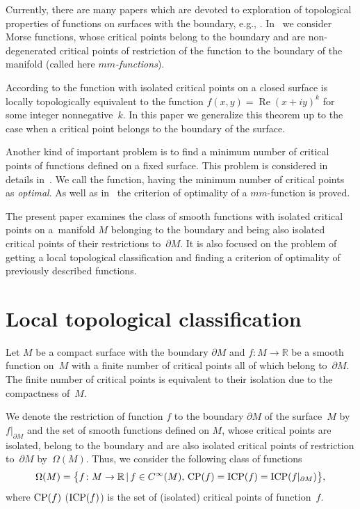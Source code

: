 \documentclass[pdftex]{sigma}
\numberwithin{equation}{section}
\begin{document}
Currently, there are many papers which are devoted to exploration of topological properties of functions on surfaces with the boundary, e.g., \cite{Hladysh/Prishlyak,Lukova/PrishlyakA/PrishlyakK,Maksumenko/Polulyakh,Vyatchaninova}. In~\cite{Hladysh/Prishlyak} we consider Morse functions, whose critical points belong to the boundary and are non-degenerated critical points of restriction of the function to the boundary of the manifold (called here $mm$\emph{-functions}).

According to \cite[Theorem~1.3]{Prishlyak2002} the function with isolated critical points on a closed surface is locally topologically equivalent to the function $f(x,y)=\operatorname{Re}(x+iy)^{k}$ for some integer non\-ne\-ga\-tive~$k$. In this paper we generalize this theorem up to the case when a critical point belongs to the boundary of the surface.

Another kind of important problem is to f\/ind a minimum number of critical points of functions def\/ined on a f\/ixed surface. This problem is considered in details in~\cite{Hladysh/Prishlyak,Lukova}. We call the function, having the minimum number of critical points as \emph{optimal}. As well as in~\cite{Hladysh/Prishlyak} the criterion of optimality of a $mm$-function is proved.

The present paper examines the class of smooth functions with isolated critical points on a~manifold $M$ belonging to the boundary and being also isolated critical points of their restrictions to~$\partial M$. It is also focused on the problem of getting a local topological classif\/ication and f\/inding a criterion of optimality of previously described functions.

\section{Local topological classif\/ication}

Let $M$ be a compact surface with the boundary $\partial M$ and $f\colon M \rightarrow \mathbb{R}$ be a smooth function on~$M$ with a f\/inite number of critical points all of which belong to~$\partial M$. The f\/inite number of critical points is equivalent to their isolation due to the compactness of~$M$.

We denote the restriction of function $f$ to the boundary $\partial M$ of the surface~$M$ by~$f|_{\partial M}$ and the set of smooth functions def\/ined on $M$, whose critical points are isolated, belong to the boundary and are also isolated critical points of restriction to~$\partial M$ by~$\Omega(M)$. Thus, we consider the following class of functions
\begin{gather*}
\Omega(M)=\big\{f\colon M\rightarrow\mathbb{R}\,|\,f\in C^{\infty}(M), \, {\rm CP}(f)={\rm ICP}(f)={\rm ICP}(f|_{\partial M})\big\},
\end{gather*}
where ${\rm CP}(f)$ (${\rm ICP}(f)$) is the set of (isolated) critical points of function~$f$.
\end{document}
